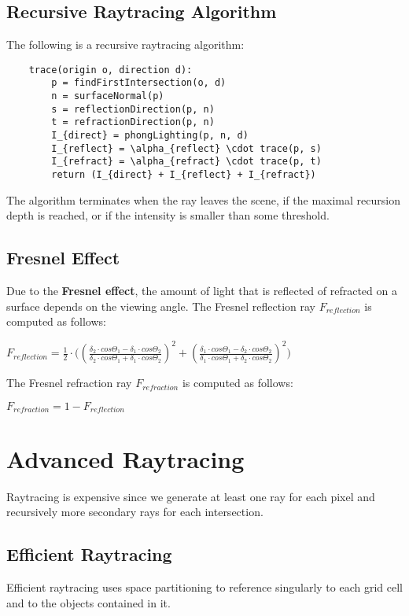 \documentclass{article}
\begin{document}
\subsection{Recursive Raytracing Algorithm}
The following is a recursive raytracing algorithm:
\begin{verbatim}
    trace(origin o, direction d):
        p = findFirstIntersection(o, d)
        n = surfaceNormal(p)
        s = reflectionDirection(p, n)
        t = refractionDirection(p, n)
        I_{direct} = phongLighting(p, n, d)
        I_{reflect} = \alpha_{reflect} \cdot trace(p, s)
        I_{refract} = \alpha_{refract} \cdot trace(p, t)
        return (I_{direct} + I_{reflect} + I_{refract})
\end{verbatim}
The algorithm terminates when the ray leaves the scene, if the maximal recursion depth is reached, or if the intensity is smaller than some threshold.
\subsection{Fresnel Effect}
Due to the \textbf{Fresnel effect}, the amount of light that is reflected of refracted on a surface depends on the viewing angle. The Fresnel reflection ray $F_{reflection}$ is computed as follows:
\begin{center}
    $F_{reflection} = \displaystyle\frac{1}{2} \cdot \big((\displaystyle\frac{\delta_2 \cdot cos\Theta_1 - \delta_1 \cdot cos\Theta_2}{\delta_2 \cdot cos\Theta_1 + \delta_1 \cdot cos\Theta_2})^2 + (\displaystyle\frac{\delta_1 \cdot cos\Theta_1 - \delta_2 \cdot cos\Theta_2}{\delta_1 \cdot cos\Theta_1 + \delta_2 \cdot cos\Theta_2})^2\big)$
\end{center}
The Fresnel refraction ray $F_{refraction}$ is computed as follows:
\begin{center}
    $F_{refraction} = 1 - F_{reflection}$
\end{center}

\newpage

\section{Advanced Raytracing}
Raytracing is expensive since we generate at least one ray for each pixel and recursively more secondary rays for each intersection.
\subsection{Efficient Raytracing}
Efficient raytracing uses space partitioning to reference singularly to each grid cell and to the objects contained in it.
\end{document}
